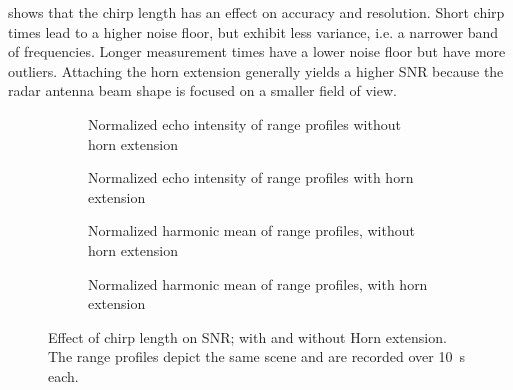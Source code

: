  shows that the chirp length has an effect on accuracy and resolution. Short chirp times lead to a higher noise floor, but exhibit less variance, i.e. a narrower band of frequencies. Longer measurement times have a lower noise floor but have more outliers. Attaching the horn extension generally yields a higher SNR because the radar antenna beam shape is focused on a smaller field of view.

\begin{figure}[htbp]
    \centering
    \begin{subfigure}{0.475 \textwidth}
        \centering
        \def\svgwidth{\linewidth} \small
        
        \caption{Normalized echo intensity of range profiles without horn extension}
        \bigskip
    \end{subfigure}
    \hfill
    \begin{subfigure}{0.475 \textwidth}
        \centering
        \def\svgwidth{\linewidth} \small
        
        \caption{Normalized echo intensity of range profiles with horn extension}
        \bigskip
    \end{subfigure}
    \begin{subfigure}{0.475 \textwidth}
        \centering
        \def\svgwidth{\linewidth} \small
        
        \caption{Normalized harmonic mean of range profiles, without horn extension}
    \end{subfigure}
    \hfill
    \begin{subfigure}{0.475 \textwidth}
        \centering
        \def\svgwidth{\linewidth} \small
        
        \caption{Normalized harmonic mean of range profiles, with horn extension}
    \end{subfigure}
    \caption{Effect of chirp length on SNR; with and without Horn extension. The range profiles depict the same scene and are recorded over \SI{10}{s} each.}
    \label{fig:fig_compare_chirp_times}
\end{figure}
